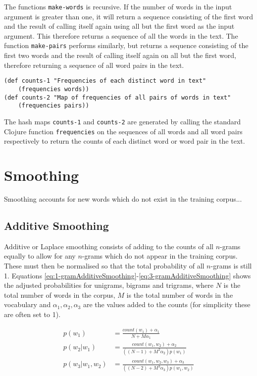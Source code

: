 The functions \lstinline!make-words! is recursive. If the number of words in the input argument is greater than one, it will return a sequence consisting of the first word and the result of calling itself again using all but the first word as the input argument. This therefore returns a sequence of all the words in the text. The function \lstinline!make-pairs! performs similarly, but returns a sequence consisting of the first two words and the result of calling itself again on all but the first word, therefore returning a sequence of all word pairs in the text.

\begin{lstlisting}
(def counts-1 "Frequencies of each distinct word in text" 
	(frequencies words))
(def counts-2 "Map of frequencies of all pairs of words in text" 
	(frequencies pairs))
\end{lstlisting}

The hash maps \lstinline!counts-1! and \lstinline!counts-2! are generated by calling the standard Clojure function \lstinline!frequencies! on the sequences of all words and all word pairs respectively to return the counts of each distinct word or word pair in the text. 


\section{Smoothing} \label{sec:smoothing}

Smoothing accounts for new words which do not exist in the training corpus...


\subsection{Additive Smoothing}

Additive or Laplace smoothing consists of adding to the counts of all $n$-grams equally to allow for any $n$-grams which do not appear in the training corpus. These must then be normalised so that the total probability of all $n$-grams is still 1. Equations \ref{eq:1-gramAdditiveSmoothing}-\ref{eq:3-gramAdditiveSmoothing} shows the adjusted probabilities for unigrams, bigrams and trigrams, where $N$ is the total number of words in the corpus, $M$ is the total number of words in the vocabulary and $\alpha_{1}, \alpha_{2}, \alpha_{3}$ are the values added to the counts (for simplicity these are often set to 1).

\begin{subequations}
\begin{align}
p(w_{1})&=\frac{count(w_{1})+\alpha_{1}}{N+M\alpha_{1}} \label{eq:1-gramAdditiveSmoothing}
\\
p(w_{2}| w_{1})&=\frac{count(w_{1}, w_{2})+\alpha_{2}}{((N-1)+M^{2}\alpha_{2})p(w_{1})} \label{eq:2-gramAdditiveSmoothing}
\\
p(w_{3}| w_{1}, w_{2}) &= \frac{count(w_{1}, w_{2}, w_{3})+\alpha_{3}}{((N-2)+M^{3}\alpha_{3})p(w_{1}, w_{2})} \label{eq:3-gramAdditiveSmoothing}
\end{align}
\end{subequations}

